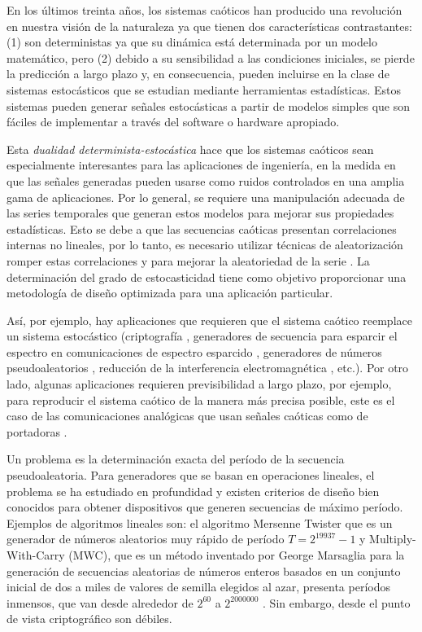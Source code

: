 En los últimos treinta años, los sistemas caóticos han producido una revolución en nuestra visión de la naturaleza ya que tienen dos características contrastantes:
(1) son deterministas ya que su dinámica está determinada por un modelo matemático, pero
(2) debido a su sensibilidad a las condiciones iniciales, se pierde la predicción a largo plazo y, en consecuencia, pueden incluirse en la clase de sistemas estocásticos que se estudian mediante herramientas estadísticas.
Estos sistemas pueden generar señales estocásticas a partir de modelos simples que son fáciles de implementar a través del software o hardware apropiado.

Esta \emph{dualidad determinista-estocástica} hace que los sistemas caóticos sean especialmente interesantes para las aplicaciones de ingeniería, en la medida en que las señales generadas pueden usarse como ruidos controlados en una amplia gama de aplicaciones.
Por lo general, se requiere una manipulación adecuada de las series temporales que generan estos modelos para mejorar sus propiedades estadísticas.
Esto se debe a que las secuencias caóticas presentan correlaciones internas no lineales, por lo tanto, es necesario utilizar técnicas de aleatorización romper estas correlaciones y para mejorar la aleatoriedad de la serie \cite{DeMicco2008}.
La determinación del grado de estocasticidad tiene como objetivo proporcionar una metodología de diseño optimizada para una aplicación particular.

Así, por ejemplo, hay aplicaciones que requieren que el sistema caótico reemplace un sistema estocástico (criptografía \cite{Fernandez2005}, generadores de secuencia para esparcir el espectro en comunicaciones de espectro esparcido \cite{Setti2004, DeMicco2007B}, generadores de números pseudoaleatorios \cite{Kocarev2003, Larrondo2006, DeMicco2009}, reducción de la interferencia electromagnética \cite{Callegari2003A}, etc.).
Por otro lado, algunas aplicaciones requieren previsibilidad a largo plazo, por ejemplo, para reproducir el sistema caótico de la manera más precisa posible, este es el caso de las comunicaciones analógicas que usan señales caóticas como de portadoras \cite{Kocarev1995, Hidalgo2001}.

Un problema es la determinación exacta del período de la secuencia pseudoaleatoria.
Para generadores que se basan en operaciones lineales, el problema se ha estudiado en profundidad y existen criterios de diseño bien conocidos para obtener dispositivos que generen secuencias de máximo período.
Ejemplos de algoritmos lineales son: el algoritmo Mersenne Twister que es un generador de números aleatorios muy rápido de período $T = 2^{19937} - 1$ \cite{Matsumoto1998} y Multiply-With-Carry (MWC), que es un método inventado por George Marsaglia para la generación de secuencias aleatorias de números enteros basados en un conjunto inicial de dos a miles de valores de semilla elegidos al azar, presenta períodos inmensos, que van desde alrededor de $2 ^ {60}$ a $2 ^ {2000000}$ \cite{Marsaglia1991}.
Sin embargo, desde el punto de vista criptográfico son débiles.

